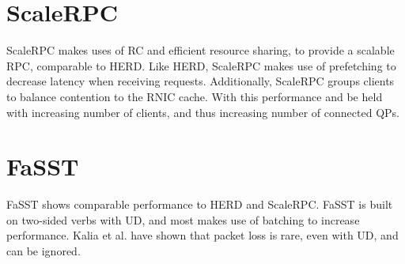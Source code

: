 \section{ScaleRPC}
ScaleRPC makes uses of RC and efficient resource sharing, to provide a scalable RPC\cite{chen2019scalable}, comparable to HERD\cite{kalia2014using}.
Like HERD, ScaleRPC makes use of prefetching to decrease latency when receiving requests.
Additionally, ScaleRPC groups clients to balance contention to the RNIC cache.
With this performance and be held with increasing number of clients, and thus increasing number of connected QPs.

\section{FaSST}
FaSST shows comparable performance to HERD and ScaleRPC.
FaSST is built on two-sided verbs with UD, and most makes use of batching to increase performance\cite{kalia2016fasst}.
Kalia et al. have shown that packet loss is rare, even with UD, and can be ignored.


